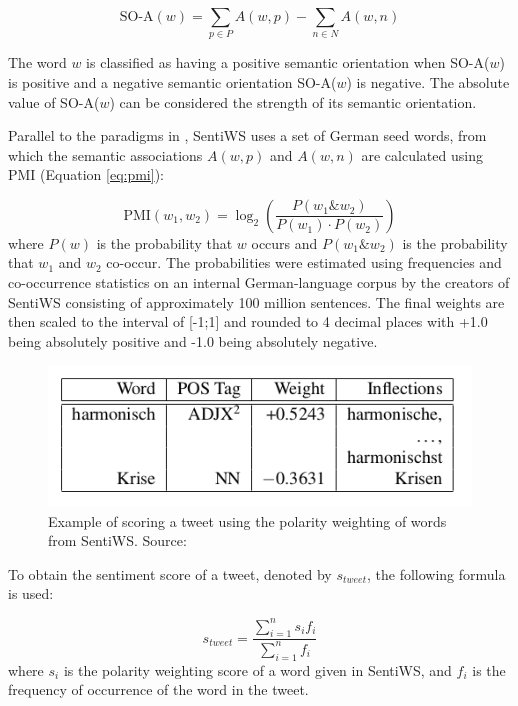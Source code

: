\documentclass[12pt,onecolumn,twoside]{layout}
\begin{document}
\begin{equation}
\label{eq:semantic_orientation}
\text{SO-A}(w) = \sum_{p \in P}A(w,p) - \sum_{n \in N}A(w,n)
\end{equation}

The word \(w\) is classified as having a positive semantic orientation when SO-A(\(w\)) is positive and a negative semantic orientation SO-A(\(w\)) is negative. The absolute value of SO-A(\(w\)) can be considered the strength of its semantic orientation.

Parallel to the paradigms in \citep{Turney2003}, SentiWS uses a set of German seed words, from which the semantic associations \(A(w,p)\) and \(A(w,n)\) are calculated using PMI (Equation \ref{eq:pmi}):

\begin{equation}
\label{eq:pmi}
\text{PMI}(w_1,w_2) = \log_2\left(\frac{P(w_1 \& w_2)}{P(w_1) \cdot P(w_2)}\right)
\end{equation}
where \(P(w)\) is the probability that \(w\) occurs and \(P(w_1 \& w_2)\) is the probability that \(w_1\) and \(w_2\) co-occur. The probabilities were estimated using frequencies and co-occurrence statistics on an internal German-language corpus by the creators of SentiWS consisting of approximately 100 million sentences. The final weights are then scaled to the interval of [-1;1] and rounded to 4 decimal places with +1.0 being absolutely positive and -1.0 being absolutely negative.

\begin{figure}
	\begin{center}
		\includegraphics[width=0.5\linewidth]{figures/sentiws_example2}
	\end{center}
	\caption{Example of scoring a tweet using the polarity weighting of words from SentiWS. Source: \citep{REMUS10.490}}
	\label{fig:sentiws_example}
\end{figure}

To obtain the sentiment score of a tweet, denoted by \(s_{tweet}\), the following formula is used:

\begin{equation}
\label{eq:word_score}
s_{tweet} = \frac{\sum_{i=1}^{n} s_i f_i}{\sum_{i=1}^{n} f_i}
\end{equation}
where \(s_i\) is the polarity weighting score of a word given in SentiWS, and \(f_i\) is the frequency of occurrence of the word in the tweet.
\end{document}

